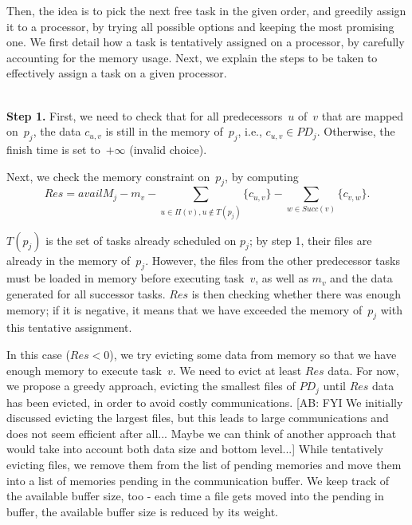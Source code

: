 \documentclass[conference]{IEEEtran}
\newcommand{\PD}{PD}
\newcommand{\AB}[1]{{\color{purple}[AB: #1]}}
\begin{document}
\smallskip

    Then, the idea is to pick the next free task in the given order,
    and greedily assign it to a processor, by trying all possible options
    and keeping the most promising one. We first detail how a task
    is tentatively assigned on a processor, by carefully accounting for the memory usage.
    Next, we explain the steps to be taken to effectively assign a task on a given processor.

    \medskip
    \\
    {\bf Step 1.} First, we need to check that for all predecessors~$u$ of~$v$ that are mapped
    on~$p_j$, the data $c_{u,v}$ is still in the memory of~$p_j$,
    i.e., $c_{u,v}\in PD_j$. Otherwise, the finish time is set to~$+\infty$ (invalid choice).

    \smallskip
     Next, we check the memory constraint on~$p_j$, by computing
    \[Res = availM_j - m_v - \sum_{u \in \Pi(v), u\notin T(p_j)}  \{c_{u,v}\}
    - \sum_{w\in Succ(v)}  \{c_{v,w}\}.\]

    $T(p_j)$ is the set of tasks already scheduled on $p_j$; by step 1, their files are
    already in the memory of~$p_j$. However, the files from the
    other predecessor tasks must be loaded in memory before executing task~$v$,
    as well as $m_v$ and the data generated for all successor tasks.
    $Res$ is then checking whether there was enough memory; if it is negative,
    it means that we have exceeded the memory of~$p_j$ with this tentative
    assignment.

    In this case ($Res <0$), we try evicting
    some data from memory so that we have enough memory to execute task~$v$.
    We need to evict at least $Res$ data.
    For now, we propose a greedy approach, evicting the smallest files of $\PD_j$ until $Res$ data has been evicted,
    in order to avoid costly communications.
    \AB{FYI We initially discussed evicting the largest files, but this leads to
    large communications and does not seem efficient after all... Maybe we can think of another
    approach that would take into account both data size and bottom level...}
    While tentatively evicting files, we remove them from the list of pending memories and move them into a list
    of memories pending in the communication buffer.
    We keep track of the available buffer size, too - each time a file gets moved into the pending in buffer, the available buffer size is reduced by its weight.
\end{document}
